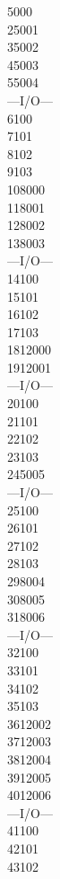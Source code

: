 \documentclass[12pt]{article}
\newcommand\tab[1][1cm]{\hspace*{#1}}
\begin{document}
\tab 5000\\
2\tab 5001\\
3\tab 5002\\
4\tab 5003\\
5\tab 5004\\
---I/O---\\
6\tab 100\\
7\tab 101\\
8\tab 102\\
9\tab 103\\
10\tab 8000\\
11\tab 8001\\
12\tab 8002\\
13\tab 8003\\
---I/O---\\
14\tab 100\\
15\tab 101\\
16\tab 102\\
17\tab 103\\
18\tab 12000\\
19\tab 12001\\
---I/O---\\
20\tab 100\\
21\tab 101\\
22\tab 102\\
23\tab 103\\
24\tab 5005\\
---I/O---\\
25\tab 100\\
26\tab 101\\
27\tab 102\\
28\tab 103\\
29\tab 8004\\
30\tab 8005\\
31\tab 8006\\
---I/O---\\
32\tab 100\\
33\tab 101\\
34\tab 102\\
35\tab 103\\
36\tab 12002\\
37\tab 12003\\
38\tab 12004\\
39\tab 12005\\
40\tab 12006\\
---I/O---\\
41\tab 100\\
42\tab 101\\
43\tab 102\\
\end{document}
